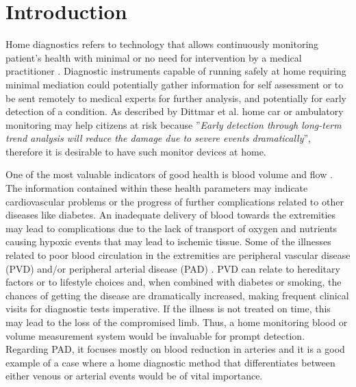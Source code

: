 
\chapter{Introduction}  %

\ifpdf
    \graphicspath{{Chapter1/Figs/Raster/}{Chapter1/Figs/PDF/}{Chapter1/Figs/}}
\else
    \graphicspath{{Chapter1/Figs/Vector/}{Chapter1/Figs/}}
\fi

Home diagnostics refers to technology that allows continuously monitoring patient's health with minimal or no need for intervention by a medical practitioner \cite{dittmar2004new}. Diagnostic instruments capable of running safely at home requiring minimal mediation could potentially gather information for self assessment or to be sent remotely to medical experts for further analysis, and potentially for early detection of a condition. As described by Dittmar et al. \cite{dittmar2004new} home car or ambulatory monitoring may help citizens at risk because ''\textit{Early detection through long-term trend analysis will reduce the damage due to severe events dramatically}'', therefore it is desirable to have such monitor devices at home.

One of the most valuable indicators of good health is blood volume and flow \cite{bloodcirculation}. The information contained within these health parameters may indicate cardiovascular problems or the progress of further complications related to other diseases like diabetes. An inadequate delivery of blood towards the extremities may lead to complications due to the lack of transport of oxygen and nutrients causing hypoxic events that may lead to ischemic tissue. Some of the illnesses related to poor blood circulation in the extremities are peripheral vascular disease (PVD) and/or peripheral arterial disease (PAD) \cite{novo2004critical}. PVD can relate to hereditary factors or to lifestyle choices and, when combined with diabetes or smoking, the chances of getting the disease are dramatically increased, making frequent clinical visits for diagnostic tests imperative. If the illness is not treated on time, this may lead to the loss of the compromised limb. Thus, a home monitoring blood or volume measurement system would be invaluable for prompt detection. Regarding PAD, it focuses mostly on blood reduction in arteries and it is a good example of a case where a home diagnostic method that differentiates between either venous or arterial events would be of vital importance. 

